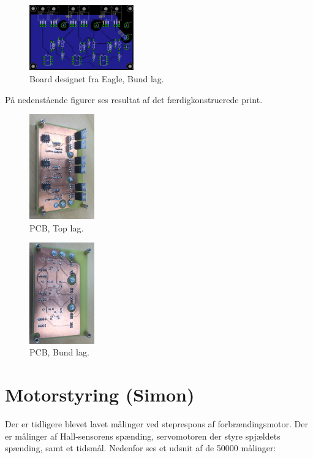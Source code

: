 \begin{figure}[h]
  \centering
  \includegraphics[width=0.4\textwidth]{dia5.png}
  \caption{Board designet fra Eagle, Bund lag.}
  \label{fig:dia5}
\end{figure}
\clearpage
På nedenstående figurer ses resultat af det færdigkonstruerede print.
\begin{figure}[h]
  \centering
  \includegraphics[width=0.25\textwidth]{dia6.png}
  \caption{PCB, Top lag.}
  \label{fig:dia6}
\end{figure}

\begin{figure}[h]
  \centering
  \includegraphics[width=0.25\textwidth]{diag7.png}
  \caption{PCB, Bund lag.}
  \label{fig:dia7}
\end{figure}
\clearpage
\section{Motorstyring (Simon)}
\label{sec:motorstyring-simon}

Der er tidligere blevet lavet målinger ved steprespons af forbrændingsmotor. Der er målinger af Hall-sensorens spænding, servomotoren der styre spjældets spænding, samt et tidsmål. Nedenfor ses et udsnit af de 50000 målinger:

